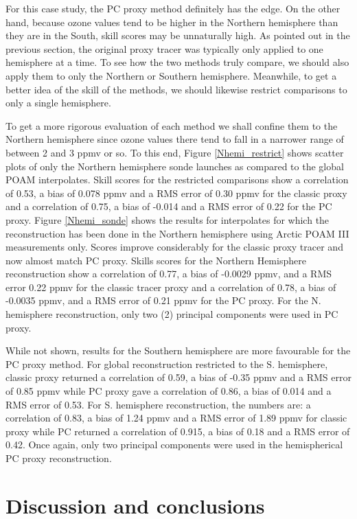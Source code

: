 For this case study, the PC proxy method definitely has the edge. On the other
hand, because ozone values tend to be higher in the Northern hemisphere than
they are in the South, skill scores may be unnaturally high.
As pointed out in the previous section, the original proxy tracer was 
typically only applied to one hemisphere at a time.
To see how the two methods truly compare, we should also apply them to only the
Northern or Southern hemisphere.
Meanwhile, to get a better idea of the skill of the methods, we should likewise
restrict comparisons to only a single hemisphere.

To get a more rigorous evaluation of each method we shall confine them
to the Northern hemisphere
since ozone values there tend to fall in a narrower range of 
between 2 and 3 ppmv or so.
To this end, Figure \ref{Nhemi_restrict} shows scatter plots of only the
Northern hemisphere sonde launches as compared to the global POAM interpolates.
Skill scores for the restricted comparisons show a correlation of 0.53,
a bias of 0.078 ppmv and a RMS error of 0.30 ppmv for the classic proxy
and a correlation of 0.75, a bias of -0.014 and a RMS error of 0.22 for
the PC proxy.
Figure \ref{Nhemi_sonde} shows the results for interpolates for which the
reconstruction has been done in the Northern hemisphere using 
Arctic POAM III measurements only.
Scores improve considerably for the classic proxy tracer and now almost
match PC proxy.
Skills scores for the Northern Hemisphere reconstruction show a correlation
of 0.77, a bias of -0.0029 ppmv, and a RMS error 0.22 ppmv for the classic
tracer proxy and a correlation of 0.78, a bias of -0.0035 ppmv,
and a RMS error of 0.21 ppmv for the PC proxy.
For the N. hemisphere reconstruction, only two (2) principal components were
used in PC proxy.

While not shown, results for the Southern hemisphere are more 
favourable for the PC proxy method.
For global reconstruction restricted to the S. hemisphere, classic proxy
returned a correlation of 0.59, a bias of -0.35 ppmv and a RMS error 
of 0.85 ppmv while PC proxy gave a correlation of 0.86, a bias of 0.014
and a RMS error of 0.53.
For S. hemisphere reconstruction, the numbers are: a correlation of 0.83,
a bias of 1.24 ppmv and a RMS error of 1.89 ppmv for classic proxy
while PC returned a correlation of 0.915, a bias of 0.18 and a RMS error
of 0.42.
Once again, only two principal components were used in the hemispherical PC
proxy reconstruction.

\section{Discussion and conclusions}

